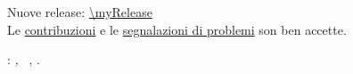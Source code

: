 \clearpage
{}
\thispagestyle{empty}

\hfill

\vfill

\noindent Nuove release: \url{\myRelease} \\
Le \href{\myPullRequest}{contribuzioni} e le \href{\myIssue}{segnalazioni
di problemi} son ben accette.

\vspace{5px}

\noindent\myName: \textit{\myTitle,}
\textcopyright\ \myCopyright, \the\year.
